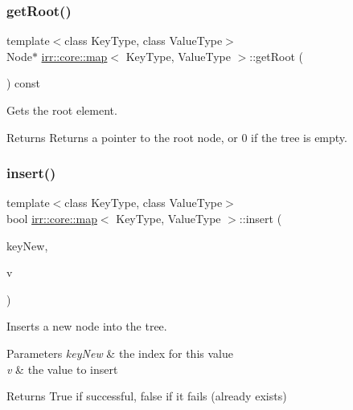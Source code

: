 \subsubsection{\texorpdfstring{get\+Root()}{getRoot()}}
{\footnotesize\ttfamily template$<$class Key\+Type, class Value\+Type$>$ \\
Node$\ast$ \hyperlink{classirr_1_1core_1_1map}{irr\+::core\+::map}$<$ Key\+Type, Value\+Type $>$\+::get\+Root (\begin{DoxyParamCaption}{ }\end{DoxyParamCaption}) const\hspace{0.3cm}{\ttfamily [inline]}}



Gets the root element. 

\begin{DoxyReturn}{Returns}
Returns a pointer to the root node, or 0 if the tree is empty. 
\end{DoxyReturn}
\mbox{\label{classirr_1_1core_1_1map_af9f8f34cab620e3bdc1ae72715ab9d15}} 
\subsubsection{\texorpdfstring{insert()}{insert()}}
{\footnotesize\ttfamily template$<$class Key\+Type, class Value\+Type$>$ \\
bool \hyperlink{classirr_1_1core_1_1map}{irr\+::core\+::map}$<$ Key\+Type, Value\+Type $>$\+::insert (\begin{DoxyParamCaption}\item[{const Key\+Type \&}]{key\+New,  }\item[{const Value\+Type \&}]{v }\end{DoxyParamCaption})\hspace{0.3cm}{\ttfamily [inline]}}



Inserts a new node into the tree. 


\begin{DoxyParams}{Parameters}
{\em key\+New} & the index for this value \\
\hline
{\em v} & the value to insert \\
\hline
\end{DoxyParams}
\begin{DoxyReturn}{Returns}
True if successful, false if it fails (already exists) 
\end{DoxyReturn}
\mbox{\label{classirr_1_1core_1_1map_a2a5b309f8737e2aca9668e32c71f05ed}} 
